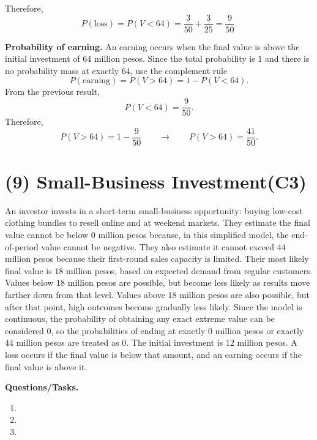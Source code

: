 Therefore,
\[
P(\text{loss})=P(V<64)=\frac{3}{50}+\frac{3}{25}=\frac{9}{50}.
\]

\textbf{Probability of earning.}
An earning occurs when the final value is above the initial investment of $64$ million pesos. Since the total probability is $1$ and there is no probability mass at exactly $64$, use the complement rule
\[
P(\text{earning})=P(V>64)=1-P(V<64).
\]
From the previous result,
\[
P(V<64)=\frac{9}{50}.
\]
Therefore,
\[
P(V>64)=1-\frac{9}{50}\qquad \longrightarrow \qquad P(V>64)=\frac{41}{50}.
\]

	


	
\section{(9) Small-Business Investment(C3)}
\label{sec:small-business-investment-c3}

An investor invests in a short-term small-business opportunity: buying low-cost clothing bundles to resell online and at weekend markets. They estimate the final value cannot be below $0$ million pesos because, in this simplified model, the end-of-period value cannot be negative. They also estimate it cannot exceed $44$ million pesos because their first-round sales capacity is limited. Their most likely final value is $18$ million pesos, based on expected demand from regular customers. Values below $18$ million pesos are possible, but become less likely as results move farther down from that level. Values above $18$ million pesos are also possible, but after that point, high outcomes become gradually less likely. Since the model is continuous, the probability of obtaining any exact extreme value can be considered $0$, so the probabilities of ending at exactly $0$ million pesos or exactly $44$ million pesos are treated as $0$. The initial investment is $12$ million pesos. A loss occurs if the final value is below that amount, and an earning occurs if the final value is above it.

\textbf{Questions/Tasks.}
\begin{enumerate}[label=\textbf{\alph*)}]
	\item {}
	\item {}
	\item {}
\end{enumerate}

